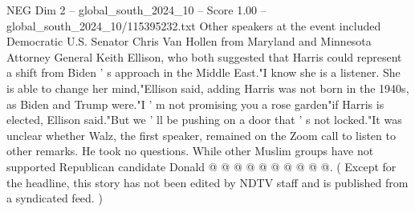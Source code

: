 \begin{textsample}{NEG Dim 2 – global\_south\_2024\_10 – Score 1.00 – global\_south\_2024\_10/115395232.txt}
Other speakers at the event included Democratic U.S.
Senator Chris Van Hollen from Maryland and Minnesota Attorney General Keith Ellison, who both suggested that Harris could represent a shift from Biden ' s approach in the Middle East."I know she is a listener.
She is able to change her mind,"Ellison said, adding Harris was not born in the 1940s, as Biden and Trump were."I ' m not promising you a rose garden"if Harris is elected, Ellison said."But we ' ll be pushing on a door that ' s not locked."It was unclear whether Walz, the first speaker, remained on the Zoom call to listen to other remarks.
He took no questions.
While other Muslim groups have not supported Republican candidate Donald @ @ @ @ @ @ @ @ @ @. ( Except for the headline, this story has not been edited by NDTV staff and is published from a syndicated feed. )

\end{textsample}
